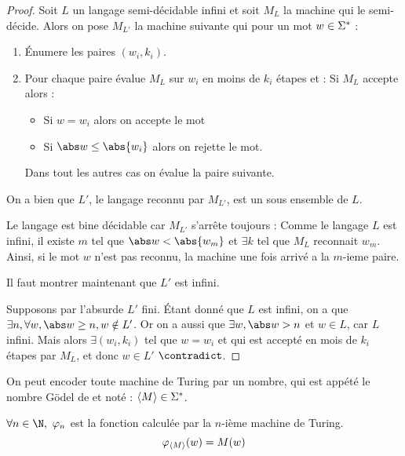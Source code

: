 \begin{proof}
	Soit $L$ un langage semi-décidable infini et soit $M_L$ la machine qui le semi-décide. Alors
	on pose $M_{L'}$ la machine suivante qui pour un mot $w \in \Sigma^{*}$ :
	\begin{enumerate}
		\item Énumere les paires $(w_i,k_i)$.
		\item Pour chaque paire évalue $M_L$ sur $w_i$ en moins de $k_i$ étapes et :
		      Si $M_L$ accepte alors :
		      \begin{itemize}
			      \item Si $w = w_i$ alors on accepte le mot
			      \item Si $\abs w \leq \abs {w_i}$ alors on rejette le mot.
		      \end{itemize}
		      Dans tout les autres cas on évalue la paire suivante.
	\end{enumerate}
	On a bien que $L'$, le langage reconnu par $M_{L'}$, est un sous ensemble de $L$.

	Le langage est bine décidable car $M_{L'}$ s'arrête toujours : Comme le langage $L$ est infini, il existe
	$m$ tel que $\abs w < \abs {w_m}$ et $\exists k$ tel que $M_L$ reconnait $w_m$. Ainsi, si le mot $w$ n'est pas reconnu,
	la machine une fois arrivé a la $m$-ieme paire.

	Il faut montrer maintenant que $L'$ est infini.

	Supposons par l'absurde $L'$ fini. Étant donné que $L$ est infini, on a que $\exists n, \forall w, \abs w \geq n, w \notin L'$.
	Or on a aussi que $\exists w, \abs w > n$ et $w \in L$, car $L$ infini. Mais alors $\exists (w_i,k_i)$ tel que $w = w_i$ et qui est
	accepté en mois de $k_i$ étapes par $M_L$, et donc $w \in L'$ $\contradict$.
\end{proof}

\begin{definition}
	On peut encoder toute machine de Turing par un nombre, qui est appété
	le nombre Gödel de et noté : $\left\langle M\right\rangle \in \Sigma^{*}$.
\end{definition}



\begin{definition} \label{def:enum}
	$\forall n \in \N, \ \phi_n$ est la fonction calculée par la $n$-ième machine de Turing.
	$$\varphi_{\left\langle M\right\rangle} (w) = M (w)$$
\end{definition}


